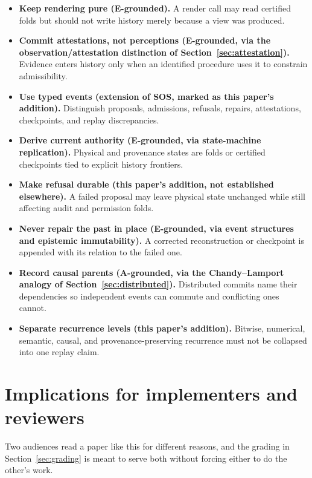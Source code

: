 \documentclass[11pt]{article}
\begin{document}
\begin{itemize}[leftmargin=1.2cm]
\item \textbf{Keep rendering pure (E-grounded).} A render call may read certified folds but should not write history merely because a view was produced.
\item \textbf{Commit attestations, not perceptions (E-grounded, via the observation/attestation distinction of Section~\ref{sec:attestation}).} Evidence enters history only when an identified procedure uses it to constrain admissibility.
\item \textbf{Use typed events (extension of SOS, marked as this paper's addition).} Distinguish proposals, admissions, refusals, repairs, attestations, checkpoints, and replay discrepancies.
\item \textbf{Derive current authority (E-grounded, via state-machine replication).} Physical and provenance states are folds or certified checkpoints tied to explicit history frontiers.
\item \textbf{Make refusal durable (this paper's addition, not established elsewhere).} A failed proposal may leave physical state unchanged while still affecting audit and permission folds.
\item \textbf{Never repair the past in place (E-grounded, via event structures and epistemic immutability).} A corrected reconstruction or checkpoint is appended with its relation to the failed one.
\item \textbf{Record causal parents (A-grounded, via the Chandy--Lamport analogy of Section~\ref{sec:distributed}).} Distributed commits name their dependencies so independent events can commute and conflicting ones cannot.
\item \textbf{Separate recurrence levels (this paper's addition).} Bitwise, numerical, semantic, causal, and provenance-preserving recurrence must not be collapsed into one replay claim.
\end{itemize}

\section{Implications for implementers and reviewers}
\label{sec:implications}

Two audiences read a paper like this for different reasons, and the grading in Section~\ref{sec:grading} is meant to serve both without forcing either to do the other's work.
\end{document}
